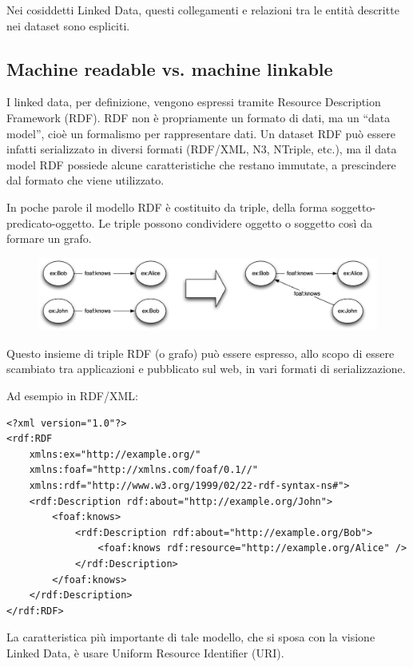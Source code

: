 Nei cosiddetti Linked Data, questi collegamenti e relazioni tra le entità descritte nei dataset sono espliciti.
\subsection{Machine readable vs. machine linkable}
I linked data, per definizione, vengono espressi tramite Resource Description Framework (RDF). RDF non è propriamente un formato di dati, ma un “data model”, cioè un formalismo per rappresentare dati. Un dataset RDF può essere infatti serializzato in diversi formati (RDF/XML, N3, NTriple, etc.), ma il data model RDF possiede alcune caratteristiche che restano immutate, a prescindere dal formato che viene utilizzato.

In poche parole il modello RDF è costituito da triple, della forma soggetto-predicato-oggetto. Le triple possono condividere oggetto o soggetto così da formare un grafo.

\begin{figure}[htbp]
  \centering
  \includegraphics[width=.9\textwidth]
    {./images/triples1-crop}
\end{figure}

Questo insieme di triple RDF (o grafo) può essere espresso, allo scopo di essere scambiato tra applicazioni e pubblicato sul web, in vari formati di serializzazione.

Ad esempio in RDF/XML:
\lstset{ basicstyle=\LSTfont, columns=fullflexible, xleftmargin=5mm, framexleftmargin=5mm, numbers=left, stepnumber=1, breaklines=true, breakatwhitespace=false, numberstyle=\footnotesize, numbersep=5pt, tabsize=2, frame=lines, captionpos=b}
\begin{lstlisting}
<?xml version="1.0"?>
<rdf:RDF
    xmlns:ex="http://example.org/"
    xmlns:foaf="http://xmlns.com/foaf/0.1//"
    xmlns:rdf="http://www.w3.org/1999/02/22-rdf-syntax-ns#">
    <rdf:Description rdf:about="http://example.org/John">
        <foaf:knows>
            <rdf:Description rdf:about="http://example.org/Bob">
                <foaf:knows rdf:resource="http://example.org/Alice" />
            </rdf:Description>
        </foaf:knows>
    </rdf:Description>
</rdf:RDF>
\end{lstlisting}
La caratteristica più importante di tale modello, che si sposa con la visione Linked Data, è usare Uniform Resource Identifier (URI).


